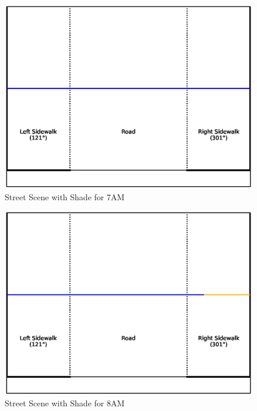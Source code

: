 \documentclass[nohyperref]{article}
\theoremstyle{plain}
\theoremstyle{definition}
\theoremstyle{remark}
\begin{document}
\begin{figure}[ht]
\begin{center}
\centerline{\includegraphics[width=\columnwidth]{sidewalk_predictions/shade_at_7}}
\caption{Street Scene with Shade for 7AM}
\end{center}
\end{figure}

\begin{figure}[ht]
\begin{center}
\centerline{\includegraphics[width=\columnwidth]{sidewalk_predictions/shade_at_8}}
\caption{Street Scene with Shade for 8AM}
\end{center}
\end{figure}
\end{document}
